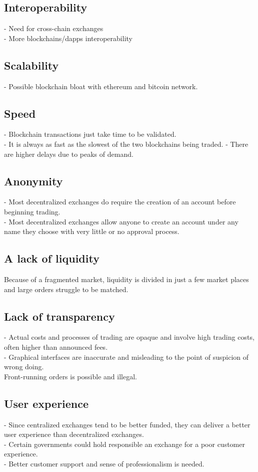 \documentclass[]{article}
\begin{document}
	\subsection{Interoperability}
	- Need for cross-chain exchanges  \\
	- More blockchains/dapps interoperability\\
	\subsection{Scalability}
	- Possible blockchain bloat with ethereum and bitcoin network.  
	\subsection{Speed}
	- Blockchain transactions just take time to be validated.\\ 
	- It is always as fast as the slowest of the two blockchains being traded.
	- There are higher delays due to peaks of demand.
	\subsection{Anonymity}
	- Most decentralized exchanges do require the creation of an account before beginning trading.\\ 
	- Most decentralized exchanges allow anyone to create an account under any name they choose with very little or no approval process.\\
	\subsection{A lack of liquidity}	
	Because of a fragmented market, liquidity is divided in just a few market places and large orders struggle to be matched.
	\subsection{Lack of transparency}
	- Actual costs and processes of trading are opaque and involve high trading costs, often higher than announced fees.\\ 
	- Graphical interfaces are inaccurate and misleading to the point of suspicion of wrong doing.\\
	Front-running orders is possible and illegal.
	\subsection{User experience}
	- Since centralized exchanges tend to be better funded, they can deliver a better user experience than decentralized exchanges.\\ 
	- Certain governments could hold responsible an exchange for a poor customer experience.\\
	- Better customer support and sense of professionalism is needed.
	
\end{document}
